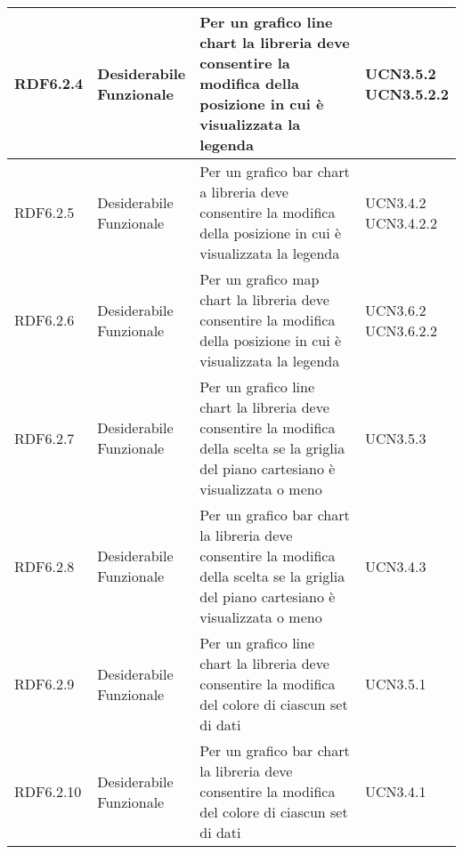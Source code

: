 \begin{longtabu}[c]{|X[0.7,l]|X[l]|X[2.5,l]|X[l]|}
                RDF6.2.4 & 
                \parbox[t]{4cm}{ Desiderabile \\ Funzionale} & Per un grafico line chart la libreria deve consentire la modifica della posizione in cui è visualizzata la legenda & \parbox[t]{4cm}{UCN3.5.2 \\ UCN3.5.2.2 }  \\ 
                \hline
                
                RDF6.2.5 & 
                \parbox[t]{4cm}{ Desiderabile \\ Funzionale} & Per un grafico bar chart a libreria deve consentire la modifica della posizione in cui è visualizzata la legenda & \parbox[t]{4cm}{UCN3.4.2 \\ UCN3.4.2.2 }  \\ 
                \hline
                
                RDF6.2.6 & 
                \parbox[t]{4cm}{ Desiderabile \\ Funzionale} & Per un grafico map chart la libreria deve consentire la modifica della posizione in cui è visualizzata la legenda & \parbox[t]{4cm}{UCN3.6.2 \\ UCN3.6.2.2 }  \\ 
                \hline
                
                RDF6.2.7 & 
                \parbox[t]{4cm}{ Desiderabile \\ Funzionale} & Per un grafico line chart la libreria deve consentire la modifica della scelta se la griglia del piano cartesiano è visualizzata o meno & \parbox[t]{4cm}{UCN3.5.3 }  \\ 
                \hline
                
                RDF6.2.8 & 
                \parbox[t]{4cm}{ Desiderabile \\ Funzionale} & Per un grafico bar chart la libreria deve consentire la modifica della scelta se la griglia del piano cartesiano è visualizzata o meno & \parbox[t]{4cm}{UCN3.4.3 }  \\ 
                \hline
                
                RDF6.2.9 & 
                \parbox[t]{4cm}{ Desiderabile \\ Funzionale} & Per un grafico line chart la libreria deve consentire la modifica del colore di ciascun set di dati & \parbox[t]{4cm}{UCN3.5.1 }  \\ 
                \hline
                
                RDF6.2.10 & 
                \parbox[t]{4cm}{ Desiderabile \\ Funzionale} & Per un grafico bar chart la libreria deve consentire la modifica del colore di ciascun set di dati & \parbox[t]{4cm}{UCN3.4.1 }  \\ 
                \hline
                

\end{longtabu}
